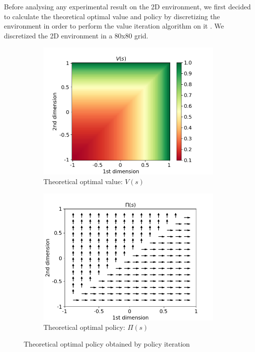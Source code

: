 \documentclass{article}
\begin{document}
Before analysing any experimental result on the 2D environment, we first decided to calculate the theoretical optimal value and policy by discretizing the environment in order to perform the value iteration algorithm on it \cite{bellman_markovian_1957}. We discretized the 2D environment in a 80x80 grid.

\begin{figure}[H]
  \centering
  \begin{subfigure}[b]{0.45\linewidth}
    \includegraphics[width=\linewidth]{discrete/discrete_contour.png}
    \caption{Theoretical optimal value: $V(s)$ }
  \end{subfigure}
  \begin{subfigure}[b]{0.45\linewidth}
    \includegraphics[width=\linewidth]{discrete/discrete_arrow.png}
      \caption{Theoretical optimal policy: $\Pi(s)$ }
  \end{subfigure}
  \caption{Theoretical optimal policy obtained by policy iteration}
  \label{fig:theoretical_policy}
\end{figure}
\end{document}
